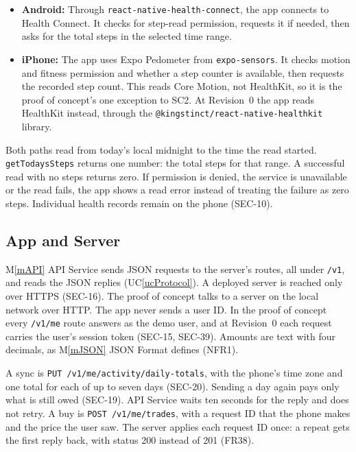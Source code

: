 \documentclass[12pt, titlepage]{article}
\newcommand{\uref}[1]{UC\ref{#1}}
\newcommand{\mref}[1]{M\ref{#1}}
\begin{document}
\begin{itemize}
\item \textbf{Android:} Through \texttt{react-native-health-connect}, the app
  connects to Health Connect. It checks for step-read permission,
  requests it if needed, then asks for the total steps in the selected time
  range.
\item \textbf{iPhone:} The app uses Expo Pedometer from
  \texttt{expo-sensors}. It checks motion and fitness permission and whether
  a step counter is available, then requests the recorded step count. This
  reads Core Motion, not HealthKit, so it is the proof of concept's one
  exception to SC2. At Revision~0 the app reads HealthKit instead, through the
  \texttt{@kingstinct/react-native-healthkit} library.
\end{itemize}

Both paths read from today's local midnight to the time the read started.
\texttt{getTodaysSteps} returns one number: the total steps for that range.
A successful read with no steps returns zero. If permission is denied,
the service is unavailable or the read fails, the app shows a read error
instead of treating the failure as zero steps. Individual health records
remain on the phone (SEC-10).

\subsection{App and Server}

\mref{mAPI} API Service sends JSON requests to the server's routes, all under
\texttt{/v1}, and reads the JSON replies (\uref{ucProtocol}). A deployed
server is reached only over HTTPS (SEC-16). The proof of concept talks to a
server on the local network over HTTP. The app never sends a user ID. In the
proof of concept every \texttt{/v1/me} route answers as the demo user, and at
Revision~0 each request carries the user's session token (SEC-15, SEC-39).
Amounts are text with four decimals, as \mref{mJSON} JSON Format defines
(NFR1).

A sync is \texttt{PUT /v1/me/activity/daily-totals}, with the phone's time
zone and one total for each of up to seven days (SEC-20). Sending a day again
pays only what is still owed (SEC-19). API Service waits ten seconds for the
reply and does not retry. A buy is
\texttt{POST /v1/me/trades}, with a request ID that the phone makes and the
price the user saw. The server applies each request ID once: a repeat gets the
first reply back, with status 200 instead of 201 (FR38).
\end{document}
